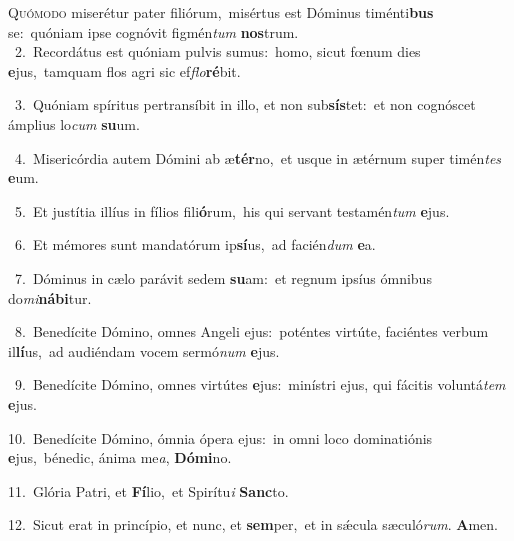 \lettrine{\initial\textcolor{\initialcolor}{Q}}{uómodo} miserétur pater filiórum,~\dagger misértus est Dóminus timénti\textbf{bus} se:~\star quóniam ipse cognóvit figmén\textit{tum} \textbf{nos}\-trum.\\
{\numbfont\textcolor{\numbcolor}{~2.}}~Recordátus est quóniam pulvis sumus:~\dagger homo, sicut fœnum dies \textbf{e}\-jus,~\star tamquam flos agri sic ef\-\textit{flo}\-\textbf{ré}bit.\par
{\numbfont\textcolor{\numbcolor}{~3.}}~Quóniam spíritus pertransíbit in illo, et non sub\-\textbf{sís}\-tet:~\star et non cognóscet ámplius lo\textit{cum} \textbf{su}\-um.\par
{\numbfont\textcolor{\numbcolor}{~4.}}~Misericórdia autem Dómini ab æ\-\textbf{tér}\-no,~\star et usque in ætérnum super timén\textit{tes} \textbf{e}\-um.\par
{\numbfont\textcolor{\numbcolor}{~5.}}~Et justítia illíus in fílios fili\-\textbf{ó}\-rum,~\star his qui servant testamén\textit{tum} \textbf{e}\-jus.\par
{\numbfont\textcolor{\numbcolor}{~6.}}~Et mémores sunt mandatórum ip\-\textbf{sí}\-us,~\star ad facién\textit{dum} \textbf{e}\-a.\par
{\numbfont\textcolor{\numbcolor}{~7.}}~Dóminus in cælo parávit sedem \textbf{su}\-am:~\star et regnum ipsíus ómnibus do\-\textit{mi}\-\textbf{ná}\textbf{bi}tur.\par
{\numbfont\textcolor{\numbcolor}{~8.}}~Benedícite Dómino, omnes Angeli ejus:~\dagger poténtes virtúte, faciéntes verbum il\-\textbf{lí}\-us,~\star ad audiéndam vocem sermó\textit{num} \textbf{e}\-jus.\par
{\numbfont\textcolor{\numbcolor}{~9.}}~Benedícite Dómino, omnes virtútes \textbf{e}\-jus:~\star minístri ejus, qui fácitis voluntá\textit{tem} \textbf{e}\-jus.\par
{\numbfont\textcolor{\numbcolor}{10.}}~Benedícite Dómino, ómnia ópera ejus:~\dagger in omni loco dominatiónis \textbf{e}\-jus,~\star bénedic, ánima me\-\textit{a}\-, \textbf{Dó}\-\textbf{mi}no.\par
{\numbfont\textcolor{\numbcolor}{11.}}~Glória Patri, et \textbf{Fí}\-lio,~\star et Spirítu\textit{i} \textbf{Sanc}\-to.\par
{\numbfont\textcolor{\numbcolor}{12.}}~Sicut erat in princípio, et nunc, et \textbf{sem}\-per,~\star et in sǽcula sæculó\-\textit{rum}\-. \textbf{A}\-men.\par
